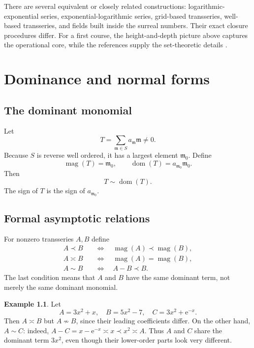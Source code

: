 \documentclass[11pt,openany]{book}
\theoremstyle{plain}
\theoremstyle{definition}
\newtheorem{example}[theorem]{Example}
\theoremstyle{remark}
\newcommand{\m}{\mathfrak{m}}
\newcommand{\magop}{\operatorname{mag}}
\newcommand{\domop}{\operatorname{dom}}
\newcommand{\e}{\mathrm{e}}
\begin{document}
\begin{advancedbox}
There are several equivalent or closely related constructions: logarithmic-exponential series, exponential-logarithmic series, grid-based transseries, well-based transseries, and fields built inside the surreal numbers. Their exact closure procedures differ. For a first course, the height-and-depth picture above captures the operational core, while the references supply the set-theoretic details \cite{DMM2001,Hoeven2006,KuhlmannTressl2011,Schmeling2001}.
\end{advancedbox}

\chapter{Dominance and normal forms}
\label{chap:valuation}

\section{The dominant monomial}
Let
\[
  T=\sum_{\m\in S}a_{\m}\m\ne0.
\]
Because $S$ is reverse well ordered, it has a largest element $\m_0$. Define
\[
  \magop(T)=\m_0,
  \qquad
  \domop(T)=a_{\m_0}\m_0.
\]
Then
\[
  T\sim\domop(T).
\]
The sign of $T$ is the sign of $a_{\m_0}$.

\section{Formal asymptotic relations}
For nonzero transseries $A,B$ define
\begin{align*}
  A\prec B
  &\quad\Longleftrightarrow\quad
    \magop(A)\prec\magop(B),\\
  A\asymp B
  &\quad\Longleftrightarrow\quad
    \magop(A)=\magop(B),\\
  A\sim B
  &\quad\Longleftrightarrow\quad
    A-B\prec B.
\end{align*}
The last condition means that $A$ and $B$ have the same dominant term, not merely the same dominant monomial.

\begin{example}
Let
\[
  A=3x^2+x,
  \quad B=5x^2-7,
  \quad C=3x^2+\e^{-x}.
\]
Then $A\asymp B$ but $A\not\sim B$, since their leading coefficients differ. On the other hand, $A\sim C$: indeed, $A-C=x-\e^{-x}\asymp x\prec x^2\asymp A$. Thus $A$ and $C$ share the dominant term $3x^2$, even though their lower-order parts look very different.
\end{example}
\end{document}
